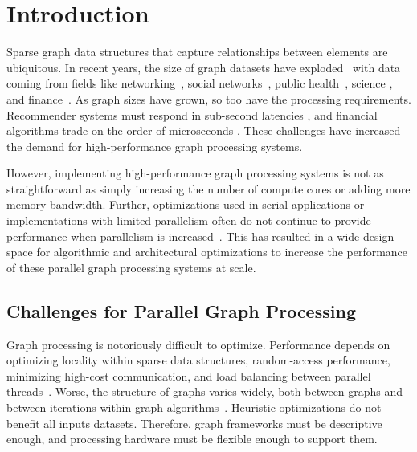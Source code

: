 \chapter{Introduction}\label{gen:sec:intro}



Sparse graph data structures that capture relationships between elements are ubiquitous.
In recent years, the size of graph datasets have exploded~\cite{sahu2017ubiquity} with data coming from fields like networking~\cite{lehmberg2014structure}, social networks~\cite{sharma2016graphjet, eksombatchai2018pixie,kwak2010twitter}, public health~\cite{keeling2005networks, Ulyantsev2016Metafast}, science \cite{tsubaki2019compound,pereira2004detection}, and finance~\cite{boginski2005finance}. 
As graph sizes have grown, so too have the processing requirements. Recommender systems must respond in sub-second latencies \cite{sharma2016graphjet, eksombatchai2018pixie}, and financial algorithms trade on the order of microseconds \cite{menkveld2018hft}.
These challenges have increased the demand for high-performance graph processing systems.

However, implementing high-performance graph processing systems is not as straightforward as simply increasing the number of compute cores or adding more memory bandwidth. 
Further, optimizations used in serial applications or implementations with limited parallelism often do not continue to provide performance when parallelism is increased~\cite{beamer2015locality}.
This has resulted in a wide design space for algorithmic and architectural optimizations to increase the performance of these parallel graph processing systems at scale.


\section{Challenges for Parallel Graph Processing}

Graph processing is notoriously difficult to optimize. 
Performance depends on optimizing locality within sparse data structures, random-access performance, minimizing high-cost communication, and load balancing between parallel threads~\cite{lumsdaine2007challenges, beamer2015locality,satish2014navigating}. 
Worse, the structure of graphs varies widely, both between graphs and between iterations within graph algorithms~\citep{lumsdaine2007challenges, beamer-bfs-direction}. Heuristic optimizations do not benefit all inputs datasets. 
Therefore, graph frameworks must be descriptive enough, and processing hardware must be flexible enough to support them.

